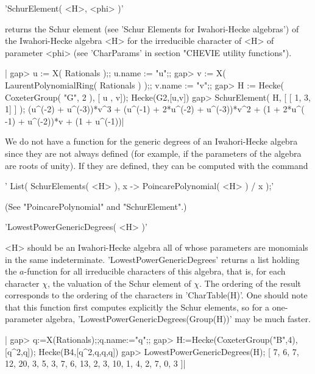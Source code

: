 
'SchurElement( <H>, <phi> )'

returns  the  Schur  element  (see  'Schur  Elements  for  Iwahori-Hecke
algebras')  of  the  Iwahori-Hecke   algebra  <H>  for  the  irreducible
character  of  <H>  of  parameter <phi>  (see  'CharParams'  in  section
"CHEVIE utility functions").

|    gap> u := X( Rationals );; u.name := "u";;
    gap> v := X( LaurentPolynomialRing( Rationals ) );; v.name := "v";;
    gap> H := Hecke( CoxeterGroup( "G", 2 ), [ u , v]);
    Hecke(G2,[u,v])
    gap> SchurElement( H, [ [ 1, 3, 1] ] );
    (u^(-2) + u^(-3))*v^3 + (u^(-1) + 2*u^(-2) + u^(-3))*v^2 + (1 + 2*u^(
    -1) + u^(-2))*v + (1 + u^(-1))|


We  do not  have a  function for  the generic  degrees of  an Iwahori-Hecke
algebra  since they are not always  defined (for example, if the parameters
of  the  algebra  are  roots  of  unity).  If they are defined, they can be
computed with the command\:

'   List( SchurElements( <H> ), x -> PoincarePolynomial( <H> ) / x );'

(See "PoincarePolynomial" and "SchurElement".)


'LowestPowerGenericDegrees( <H> )'

<H>  should  be  an  Iwahori-Hecke  algebra  all  of  whose  parameters are
monomials  in the same indeterminate. 'LowestPowerGenericDegrees' returns a
list  holding  the  $a$-function  for  all  irreducible  characters of this
algebra,  that is,  for each  character $\chi$,  the valuation of the Schur
element  of $\chi$. The ordering of  the result corresponds to the ordering
of  the characters  in 'CharTable(H)'.  One should  note that this function
first  computes  explicitly  the  Schur  elements,  so  for a one-parameter
algebra, 'LowestPowerGenericDegrees(Group(H))' may be much faster.

|    gap> q:=X(Rationals);;q.name:="q";;
    gap> H:=Hecke(CoxeterGroup("B",4),[q^2,q]);
    Hecke(B4,[q^2,q,q,q])
    gap> LowestPowerGenericDegrees(H);
    [ 7, 6, 7, 12, 20, 3, 5, 3, 7, 6, 13, 2, 3, 10, 1, 4, 2, 7, 0, 3 ]|


